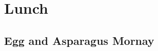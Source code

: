 \newcommand*{\LunchPath}{\RecipesPath/lunch}%

\chapter{Lunch}
  \clearpage  
  \section{Egg and Asparagus Mornay}
  \clearpage